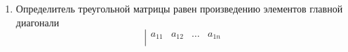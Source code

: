 \documentclass[12pt, fleqn]{article}
\begin{document}
\begin{enumerate}
\begin{multline*}
\begin{array}{cccc}
		a_{11} & a_{12} & \ldots & a_{1n}\\
		\vdots & \vdots & \ddots & \vdots\\
		a_{k1} & a_{k2} & \ldots & a_{kn}\\
		\vdots & \vdots & \ddots & \vdots\\
		a_{l1} & a_{l2} & \ldots & a_{ln}\\
		\vdots & \vdots & \ddots & \vdots\\
		a_{n1} & a_{n2} & \ldots & a_{nn}
	\end{array}
	\right|=a_{l1}A_{l1}+a_{l2}A_{l2}+\dots+a_{ln}A_{ln}\\\\
	\left|
	\begin{array}{cccc}
		a_{11} & a_{12} & \ldots & a_{1n}\\
		\vdots & \vdots & \ddots & \vdots\\
		a_{k1} & a_{k2} & \ldots & a_{kn}\\
		\vdots & \vdots & \ddots & \vdots\\
		b_{1} & b_{2} & \ldots & _{n}\\
		\vdots & \vdots & \ddots & \vdots\\
		a_{n1} & a_{n2} & \ldots & a_{nn}
	\end{array}
	\right|=b_{1}A_{l1}+b_{2}A_{l2}+\dots+b_{n}A_{ln}\\\\
	\left|
	\begin{array}{cccc}
		a_{11} & a_{12} & \ldots & a_{1n}\\
		\vdots & \vdots & \ddots & \vdots\\
		a_{k1} & a_{k2} & \ldots & a_{kn}\\
		\vdots & \vdots & \ddots & \vdots\\
		a_{k1} & a_{k2} & \ldots & a_{kn}\\
		\vdots & \vdots & \ddots & \vdots\\
		a_{n1} & a_{n2} & \ldots & a_{nn}
	\end{array}
	\right|=a_{k1}A_{l1}+a_{k2}A_{l2}+\dots+a_{kn}A_{ln}=0\\
	\text{\textit{(Свойство 5)}}\\
	\blacksquare\\
\end{multline*}
\item Определитель треугольной матрицы равен произведению элементов главной диагонали
$$\left|
\begin{array}{cccc}
	a_{11} & a_{12} & \ldots & a_{1n}\\

\end{array}$$
\end{enumerate}
\end{document}
